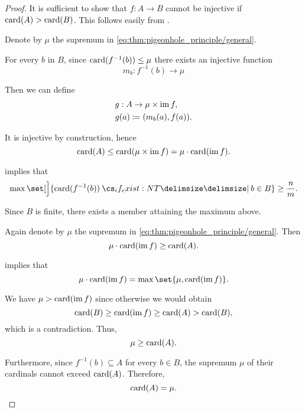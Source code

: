 \begin{proof}
   It is sufficient to show that \( f: A \to B \) cannot be injective if \( \operatorname{card}(A) > \operatorname{card}(B) \). This follows easily from .

   Denote by \( \mu \) the supremum in \eqref{eq:thm:pigeonhole_principle/general}.

  For every \( b \) in \( B \), since \( \operatorname{card}(f^{-1}(b)) \leq \mu \) there exists an injective function
  \begin{equation*}
    m_b: f^{-1}(b) \to \mu
  \end{equation*}

  Then we can define
  \begin{equation*}
    \begin{aligned}
      &g: A \to \mu \times \operatorname{im} f, \\
      &g(a) \coloneqq (m_b(a), f(a)).
    \end{aligned}
  \end{equation*}

  It is injective by construction, hence
  \begin{equation*}
    \operatorname{card}(A) \leq \operatorname{card}(\mu \times \operatorname{im} f) = \mu \cdot \operatorname{card}(\operatorname{im} f).
  \end{equation*}

    implies that
  \begin{equation*}
    \max\set[\Big]{ \card(f^{-1}(b)) \given* b \in B } \geq \frac n m.
  \end{equation*}

  Since \( B \) is finite, there exists a member attaining the maximum above.

   Again denote by \( \mu \) the supremum in \eqref{eq:thm:pigeonhole_principle/general}. Then
  \begin{equation*}
    \mu \cdot \operatorname{card}(\operatorname{im} f) \geq \operatorname{card}(A).
  \end{equation*}

   implies that
  \begin{equation*}
    \mu \cdot \card(\img f) = \max\set{ \mu, \card(\img f) }.
  \end{equation*}

  We have \( \mu > \operatorname{card}(\operatorname{im} f) \) since otherwise we would obtain
  \begin{equation*}
    \operatorname{card}(B) \geq \operatorname{card}(\operatorname{im} f) \geq \operatorname{card}(A) > \operatorname{card}(B),
  \end{equation*}
  which is a contradiction. Thus,
  \begin{equation*}
    \mu \geq \operatorname{card}(A).
  \end{equation*}

  Furthermore, since \( f^{-1}(b) \subseteq A \) for every \( b \in B \), the supremum \( \mu \) of their cardinals cannot exceed \( \operatorname{card}(A) \). Therefore,
  \begin{equation*}
    \operatorname{card}(A) = \mu.
  \end{equation*}
\end{proof}

